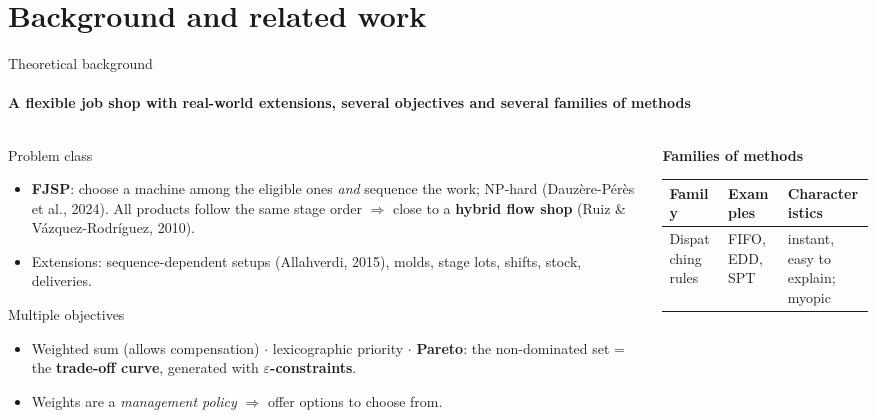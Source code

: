 \section{Background and related work}

\begin{frame}{Theoretical background}
\framesubtitle{A flexible job shop with real-world extensions, several objectives and several families of methods}
\begin{columns}[T]
\begin{column}{0.48\textwidth}
\begin{block}{Problem class}
\scriptsize
\begin{itemize}\setlength{\itemsep}{0.2em}
  \item \textbf{FJSP}: choose a machine among the eligible ones \emph{and} sequence the work; NP-hard
        (Dauzère-Pérès et al., 2024). All products follow the same stage order $\Rightarrow$ close to a
        \textbf{hybrid flow shop} (Ruiz \& Vázquez-Rodríguez, 2010).
  \item Extensions: sequence-dependent setups (Allahverdi, 2015), molds, stage lots, shifts, stock, deliveries.
\end{itemize}
\end{block}
\vspace{-0.3em}
\begin{block}{Multiple objectives}
\scriptsize
\begin{itemize}\setlength{\itemsep}{0.2em}
  \item Weighted sum (allows compensation) $\cdot$ lexicographic priority $\cdot$
        \textbf{Pareto}: the non-dominated set = the \textbf{trade-off curve}, generated with \textbf{$\varepsilon$-constraints}.
  \item Weights are a \emph{management policy} $\Rightarrow$ offer options to choose from.
\end{itemize}
\end{block}
\end{column}
\begin{column}{0.49\textwidth}
\scriptsize
\textbf{Families of methods}\par\vspace{0.2em}
\begin{tabular}{@{}L{1.75cm}L{2.0cm}L{2.85cm}@{}}
\toprule
Family & Examples & Characteristics\\
\midrule
Dispatching rules & FIFO, EDD, SPT & instant, easy to explain; myopic\\

\end{tabular}
\end{column}
\end{columns}
\end{frame}

